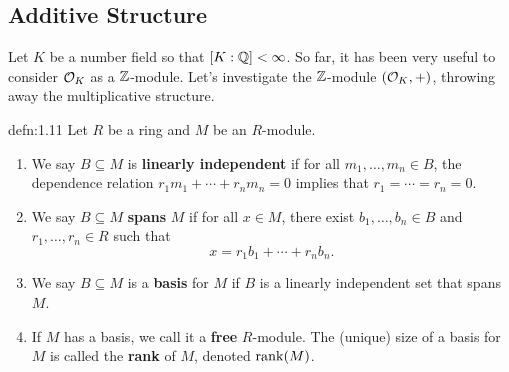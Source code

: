 \subsection{Additive Structure}\label{subsec:1.4}
Let $K$ be a number field so that $[K : \mathbb{Q}] < \infty$. So far, it has been 
very useful to consider ${\cal O}_K$ as a $\mathbb{Z}$-module. Let's investigate the 
$\mathbb{Z}$-module $({\cal O}_K, +)$, throwing away the multiplicative structure. 

\begin{defn}{defn:1.11}
    Let $R$ be a ring and $M$ be an $R$-module.
    \begin{enumerate}[(1)]
        \item We say $B \subseteq M$ is {\bf linearly independent} 
        if for all $m_1, \dots, m_n \in B$, the dependence relation 
        $r_1 m_1 + \cdots + r_n m_n = 0$ implies that $r_1 = \cdots = r_n = 0$.
        \item We say $B \subseteq M$ {\bf spans} $M$ if for all $x \in M$, 
        there exist $b_1, \dots, b_n \in B$ and $r_1, \dots, r_n \in R$ such that 
        \[ x = r_1 b_1 + \cdots + r_n b_n. \] 
        \item We say $B \subseteq M$ is a {\bf basis} for $M$ if $B$ is a 
        linearly independent set that spans $M$. 
        \item If $M$ has a basis, we call it a {\bf free} $R$-module. The 
        (unique) size of a basis for $M$ is called the {\bf rank} of $M$, 
        denoted $\operatorname{rank}(M)$. 
    \end{enumerate}
\end{defn}\vspace{-0.25cm}

